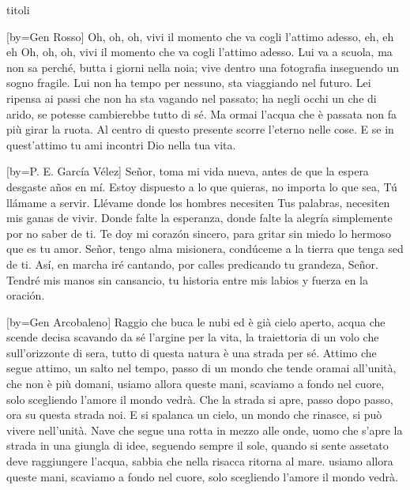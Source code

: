 \begin{songs}{titoli}

[by={Gen Rosso}]
\beginchorus
Oh, oh, oh, vivi il momento che va
cogli l'attimo adesso, eh, eh eh
Oh, oh, oh, vivi il momento che va
cogli l'attimo adesso.
\endchorus
\beginverse
Lui va a scuola, ma non sa perché, butta i giorni nella noia;
vive dentro una fotografia inseguendo un sogno fragile.
Lui non ha tempo per nessuno, sta viaggiando nel futuro.
\endverse
\beginverse
Lei ripensa ai passi che non ha sta vagando nel passato;
ha negli occhi un che di arido, se potesse cambierebbe tutto di sé.
Ma ormai l'acqua che è passata non fa più girar la ruota.
\endverse
\beginverse
Al centro di questo presente scorre l'eterno nelle cose.
E se in quest'attimo tu ami incontri Dio nella tua vita.
\endverse
\endsong

[by={P. E. García Vélez}]
\beginverse
Señor, toma mi vida nueva,
antes de que la espera desgaste años en mí.
Estoy dispuesto a lo que quieras,
no importa lo que sea, Tú llámame a servir.
\endverse
\beginchorus
Llévame donde los hombres necesiten Tus palabras,
necesiten mis ganas de vivir.
Donde falte la esperanza, donde falte la alegría
simplemente por no saber de ti.
\endchorus
\beginverse
Te doy mi corazón sincero,
para gritar sin miedo lo hermoso que es tu amor.
Señor, tengo alma misionera,
condúceme a la tierra que tenga sed de ti.
\endverse
\beginverse
Así, en marcha iré cantando,
por calles predicando tu grandeza, Señor.
Tendré mis manos sin cansancio,
tu historia entre mis labios y fuerza en la oración.
\endverse
\endsong

[by={Gen Arcobaleno}]
\beginverse
Raggio che buca le nubi ed è già cielo aperto,
acqua che scende decisa scavando da sé l'argine per la vita,
la traiettoria di un volo che sull'orizzonte di sera,
tutto di questa natura è una strada per sé.
\endverse
\beginverse
Attimo che segue attimo, un salto nel tempo,
passo di un mondo che tende oramai all'unità, che non è più domani,
usiamo allora queste mani, scaviamo a fondo nel cuore,
solo scegliendo l'amore il mondo vedrà.
\endverse
\beginchorus
Che la strada si apre, passo dopo passo, ora su questa strada noi.
E si spalanca un cielo, un mondo che rinasce, si può vivere nell'unità.
\endchorus
\beginverse
Nave che segue una rotta in mezzo alle onde,
uomo che s'apre la strada in una giungla di idee, seguendo sempre il sole,
quando si sente assetato deve raggiungere l'acqua,
sabbia che nella risacca ritorna al mare.
usiamo allora queste mani, scaviamo a fondo nel cuore,
solo scegliendo l'amore il mondo vedrà.
\endverse
\endsong


\end{songs}
